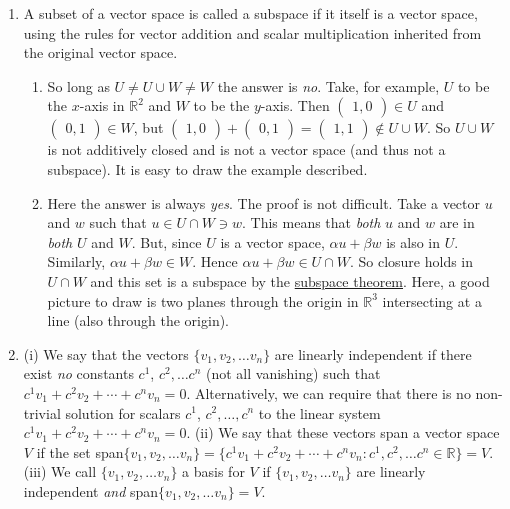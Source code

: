 \begin{enumerate}
\item  A subset of a vector space is called a subspace if it itself is a vector space, using the rules for vector addition and scalar
multiplication inherited from the original vector space.

\begin{enumerate}
\item So long as  $U\neq U\cup W\neq W$ the answer is {\itshape no}.  Take, for example, $U$ to be the $x$-axis in ${\mathbb R}^2$
and $W$ to be the $y$-axis. Then $\begin{pmatrix}1,0\end{pmatrix}\in U$ and $\begin{pmatrix}0,1\end{pmatrix}\in W$, but 
$\begin{pmatrix}1,0\end{pmatrix}+\begin{pmatrix}0,1\end{pmatrix}=\begin{pmatrix}1,1\end{pmatrix}\notin U\cup W$.
So $U\cup W$ is not additively closed and is not a vector space (and thus not a subspace). It is easy to draw the example described.
\item Here the answer is always {\itshape yes}. The proof is not difficult. Take a vector $u$ and $w$ such that $u\in U\cap W\ni w$. This means
that {\itshape both} $u$ and $w$ are in {\itshape both} $U$ and $W$. But, since $U$ is a vector space, $\alpha u + \beta w$ is also in $U$.
Similarly, $\alpha u + \beta w \in W$. Hence $\alpha u + \beta w\in U\cap W$. So closure holds in $U\cap W$ and this set is a subspace
by the \hyperref[subspacetheorem]{subspace theorem}. Here, a good picture to draw is two planes through the origin in ${\mathbb R}^3$
intersecting at a line (also through the origin).
\end{enumerate}

\item (i) We say that the vectors $\{v_1,v_2,\ldots v_n\}$ are linearly independent if there exist {\itshape no} constants $c^1$, $c^2,\ldots c^n$
(not all vanishing) such that $c^1 v_1 + c^2 v_2 +\cdots + c^n v_n=0$. Alternatively, we can require that there is no non-trivial solution for
scalars $c^1$, $c^2,\ldots, c^n $ to  the linear system  $c^1 v_1 + c^2 v_2 +\cdots + c^n v_n=0$.
(ii) We say that these vectors span a vector space $V$ if the set span$\{v_1,v_2,\ldots v_n\}=\{c^1 v_1 + c^2 v_2 +\cdots + c^n v_n:c^1,c^2,\ldots c^n\in  {\mathbb R}\}=V$. (iii) We call $\{v_1,v_2,\ldots v_n\}$ a basis for $V$ if  $\{v_1,v_2,\ldots v_n\}$ are linearly independent {\itshape and} span$\{v_1,v_2,\ldots v_n\}=V$.


\end{enumerate}

